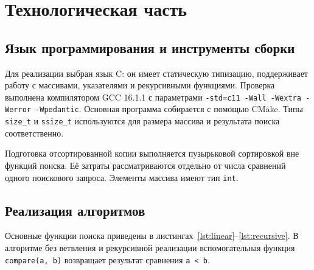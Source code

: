 \chapter{Технологическая часть}
\section{Язык программирования и инструменты сборки}
Для реализации выбран язык C: он имеет статическую типизацию, поддерживает работу с массивами, указателями и рекурсивными функциями. Проверка выполнена компилятором GCC 16.1.1 с параметрами \texttt{-std=c11 -Wall -Wextra -Werror -Wpedantic}. Основная программа собирается с помощью CMake. Типы \texttt{size\_t} и \texttt{ssize\_t} используются для размера массива и результата поиска соответственно.

Подготовка отсортированной копии выполняется пузырьковой сортировкой вне функций поиска. Её затраты рассматриваются отдельно от числа сравнений одного поискового запроса. Элементы массива имеют тип \texttt{int}.

\section{Реализация алгоритмов}
Основные функции поиска приведены в листингах~\ref{lst:linear}--\ref{lst:recursive}. В алгоритме без ветвления и рекурсивной реализации вспомогательная функция \texttt{compare(a, b)} возвращает результат сравнения \texttt{a < b}.
\par\noindent\begin{minipage}{\linewidth}

\end{minipage}\par
\par\noindent\begin{minipage}{\linewidth}

\end{minipage}\par
\par\noindent\begin{minipage}{\linewidth}

\end{minipage}\par
\par\noindent\begin{minipage}{\linewidth}

\end{minipage}\par

